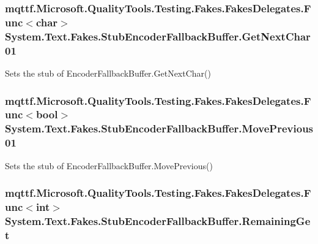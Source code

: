 \hypertarget{class_system_1_1_text_1_1_fakes_1_1_stub_encoder_fallback_buffer_a41d7f33caf66f83c5c8e289365eb50e8}{
\subsubsection[{Get\-Next\-Char01}]{\setlength{\rightskip}{0pt plus 5cm}mqttf.\-Microsoft.\-Quality\-Tools.\-Testing.\-Fakes.\-Fakes\-Delegates.\-Func$<$char$>$ System.\-Text.\-Fakes.\-Stub\-Encoder\-Fallback\-Buffer.\-Get\-Next\-Char01}}\label{class_system_1_1_text_1_1_fakes_1_1_stub_encoder_fallback_buffer_a41d7f33caf66f83c5c8e289365eb50e8}


Sets the stub of Encoder\-Fallback\-Buffer.\-Get\-Next\-Char()

\hypertarget{class_system_1_1_text_1_1_fakes_1_1_stub_encoder_fallback_buffer_a03a612b624e8772cbdb27ceaa5572364}{
\subsubsection[{Move\-Previous01}]{\setlength{\rightskip}{0pt plus 5cm}mqttf.\-Microsoft.\-Quality\-Tools.\-Testing.\-Fakes.\-Fakes\-Delegates.\-Func$<$bool$>$ System.\-Text.\-Fakes.\-Stub\-Encoder\-Fallback\-Buffer.\-Move\-Previous01}}\label{class_system_1_1_text_1_1_fakes_1_1_stub_encoder_fallback_buffer_a03a612b624e8772cbdb27ceaa5572364}


Sets the stub of Encoder\-Fallback\-Buffer.\-Move\-Previous()

\hypertarget{class_system_1_1_text_1_1_fakes_1_1_stub_encoder_fallback_buffer_a151830726334d090faaf1213b01968f4}{
\subsubsection[{Remaining\-Get}]{\setlength{\rightskip}{0pt plus 5cm}mqttf.\-Microsoft.\-Quality\-Tools.\-Testing.\-Fakes.\-Fakes\-Delegates.\-Func$<$int$>$ System.\-Text.\-Fakes.\-Stub\-Encoder\-Fallback\-Buffer.\-Remaining\-Get}}\label{class_system_1_1_text_1_1_fakes_1_1_stub_encoder_fallback_buffer_a151830726334d090faaf1213b01968f4}



